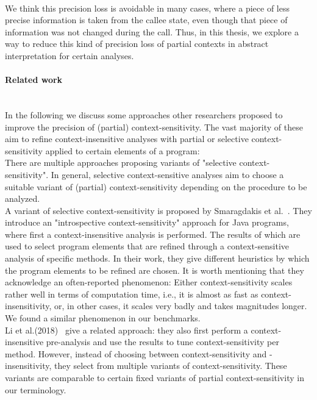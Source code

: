   \\
  We think this precision loss is avoidable in many cases, where a piece of less precise information is taken from the callee state, even though that piece of information was not changed during the call. Thus, in this thesis, we explore a way to reduce this kind of precision loss of partial contexts in abstract interpretation for certain analyses. 

  \paragraph{Related work}\mbox{}\\
  In the following we discuss some approaches other researchers proposed to improve the precision of (partial) context-sensitivity. The vast majority of these aim to refine context-insensitive analyses with partial or selective context-sensitivity applied to certain elements of a program:\\
  There are multiple approaches proposing variants of "selective context-sensitivity". In general, selective context-sensitive analyses aim to choose a suitable variant of (partial) context-sensitivity depending on the procedure to be analyzed.\\
  A variant of selective context-sensitivity is proposed by Smaragdakis et al.~\parencite{smaragdakis2014introspective}. They introduce an "introspective context-sensitivity" approach for Java programs, where first a context-insensitive analysis is performed. The results of which are used to select program elements that are refined through a context-sensitive analysis of specific methods. In their work, they give different heuristics by which the program elements to be refined are chosen. It is worth mentioning that they acknowledge an often-reported phenomenon: Either context-sensitivity scales rather well in terms of computation time, i.e., it is almost as fast as context-insensitivity, or, in other cases, it scales very badly and takes magnitudes longer. We found a similar phenomenon in our benchmarks.\\
  Li et al.(2018)~\parencite{li2018scalability} give a related approach: they also first perform a context-insensitive pre-analysis and use the results to tune context-sensitivity per method. However, instead of choosing between context-sensitivity and -insensitivity, they select from multiple variants of context-sensitivity. These variants are comparable to certain fixed variants of partial context-sensitivity in our terminology.\\
